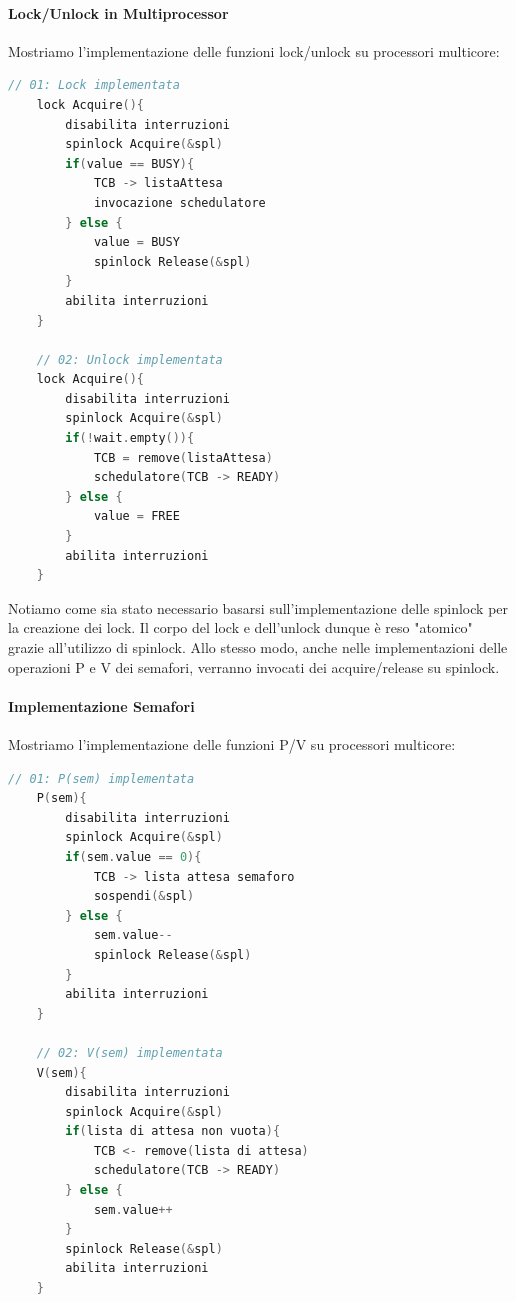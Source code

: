\documentclass{article}
\begin{document}
\paragraph{Lock/Unlock in Multiprocessor} Mostriamo l'implementazione delle funzioni lock/unlock su processori multicore:

\begin{lstlisting}[language = C]
    // 01: Lock implementata 
    lock Acquire(){
        disabilita interruzioni
        spinlock Acquire(&spl)
        if(value == BUSY){
            TCB -> listaAttesa
            invocazione schedulatore
        } else {
            value = BUSY
            spinlock Release(&spl)
        }
        abilita interruzioni
    }

    // 02: Unlock implementata
    lock Acquire(){
        disabilita interruzioni
        spinlock Acquire(&spl)
        if(!wait.empty()){
            TCB = remove(listaAttesa)
            schedulatore(TCB -> READY)
        } else {
            value = FREE
        }
        abilita interruzioni
    }
\end{lstlisting}

Notiamo come sia stato necessario basarsi sull'implementazione delle spinlock per la creazione dei lock. Il corpo del lock e dell'unlock dunque è reso "atomico" grazie
all'utilizzo di spinlock. Allo stesso modo, anche nelle implementazioni delle operazioni P e V dei semafori, verranno invocati dei acquire/release su spinlock.

\newpage

\paragraph{Implementazione Semafori} Mostriamo l'implementazione delle funzioni P/V su processori multicore:

\vspace*{15px}

\begin{lstlisting}[language = C]
    // 01: P(sem) implementata 
    P(sem){
        disabilita interruzioni
        spinlock Acquire(&spl)
        if(sem.value == 0){
            TCB -> lista attesa semaforo
            sospendi(&spl)
        } else {
            sem.value--
            spinlock Release(&spl)
        }
        abilita interruzioni
    }

    // 02: V(sem) implementata 
    V(sem){
        disabilita interruzioni
        spinlock Acquire(&spl)
        if(lista di attesa non vuota){
            TCB <- remove(lista di attesa)
            schedulatore(TCB -> READY)
        } else {
            sem.value++
        }
        spinlock Release(&spl)
        abilita interruzioni
    }
\end{lstlisting}
\end{document}
